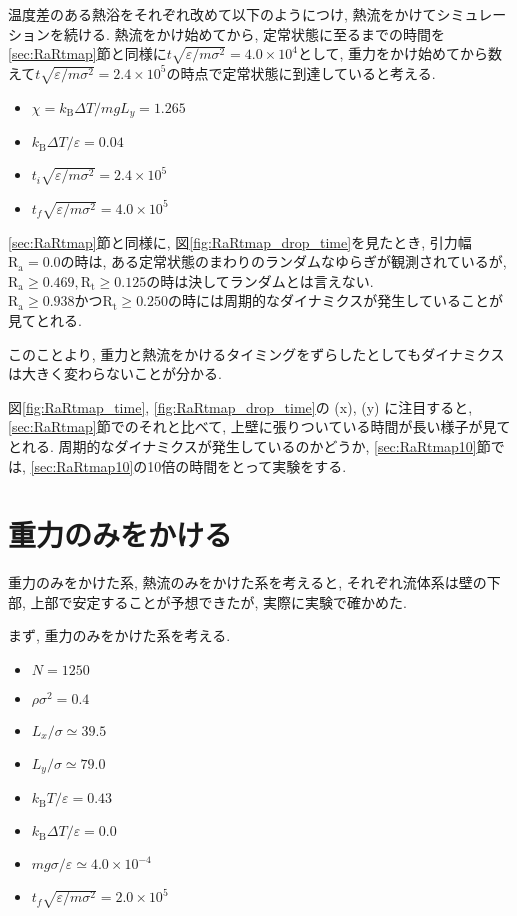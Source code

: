 温度差のある熱浴をそれぞれ改めて以下のようにつけ, 熱流をかけてシミュレーションを続ける. 熱流をかけ始めてから, 定常状態に至るまでの時間を\ref{sec:RaRtmap}節と同様に$t \sqrt{\varepsilon / m \sigma^2} = 4.0 \times 10^{4}$として, 重力をかけ始めてから数えて$t \sqrt{\varepsilon / m \sigma^2} = 2.4 \times 10^{5}$の時点で定常状態に到達していると考える. 

\begin{itemize}
  \item $\chi = k_{\text{B}}\Delta T / mg L_y = 1.265$
  \item $k_{\text{B}} \Delta T/\varepsilon = 0.04$
  \item $t_i \sqrt{\varepsilon / m \sigma^2} = 2.4 \times 10^{5}$
  \item $t_f \sqrt{\varepsilon / m \sigma^2} = 4.0 \times 10^{5}$
\end{itemize}



\ref{sec:RaRtmap}節と同様に, 図\ref{fig:RaRtmap_drop_time}を見たとき, 引力幅$\text{R}_\text{a}=0.0$の時は, ある定常状態のまわりのランダムなゆらぎが観測されているが, $\text{R}_\text{a} \ge 0.469, \text{R}_\text{t} \ge 0.125$の時は決してランダムとは言えない. $\text{R}_\text{a} \ge 0.938 かつ\text{R}_\text{t} \ge 0.250$の時には周期的なダイナミクスが発生していることが見てとれる.  

このことより, 重力と熱流をかけるタイミングをずらしたとしてもダイナミクスは大きく変わらないことが分かる. 

図\ref{fig:RaRtmap_time}, \ref{fig:RaRtmap_drop_time}の (x), (y) に注目すると, \ref{sec:RaRtmap}節でのそれと比べて, 上壁に張りついている時間が長い様子が見てとれる. 周期的なダイナミクスが発生しているのかどうか, \ref{sec:RaRtmap10}節では, \ref{sec:RaRtmap10}の10倍の時間をとって実験をする. 

\section{重力のみをかける}\label{sec:dT0}

重力のみをかけた系, 熱流のみをかけた系を考えると, それぞれ流体系は壁の下部, 上部で安定することが予想できたが, 実際に実験で確かめた. 

まず, 重力のみをかけた系を考える. 

\begin{itemize}
  \item $N = 1250$
  \item $\rho {\sigma}^2 = 0.4$
  \item $L_x / \sigma \simeq 39.5$
  \item $L_y / \sigma \simeq 79.0$
  \item $k_{\text{B}} T / \varepsilon = 0.43$
  \item $k_{\text{B}} \Delta T / \varepsilon = 0.0$
  \item $mg\sigma/\varepsilon \simeq 4.0 \times 10^{-4}$
  \item $t_f \sqrt{\varepsilon / m \sigma^2} = 2.0 \times 10^{5}$
\end{itemize}

